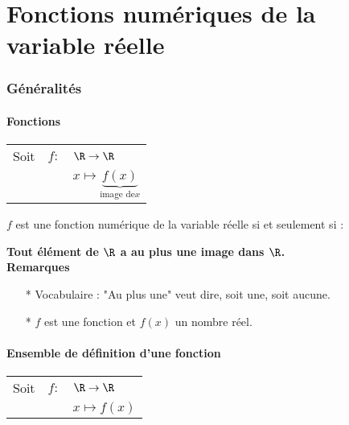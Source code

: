 \ifdefined\COMPLETE
\else
    
    
\fi


\vspace*{-.5cm}

\setcounter{section}{0} 

\part{Fonctions numériques de la variable réelle}

\section{Généralités}

\subsection{Fonctions}

\begin{tabular}{lll}
Soit & $f:$ & $ \R \rightarrow \R$ \\
& & $x\mapsto \underbrace{f(x)}_{\textrm{image de} x}$ \\
\end{tabular}

$f$ est une fonction numérique de la variable réelle si et seulement si :

\textbf{Tout élément de $\mathbf{\R}$ a au plus une image dans $\mathbf{\R}$.} \\

\textbf{Remarques}

\begin{itemize}


\item[*]Vocabulaire : "Au plus une" veut dire, soit une, soit aucune. \\ 

\item[*] $f$ est une fonction et $f(x)$ un nombre réel.
\end{itemize}
\subsection{Ensemble de définition d'une fonction}

\begin{tabular}{lll}

Soit & $f:$& $ \R \rightarrow \R$ \\
& & $x\mapsto f(x)$ \\
\end{tabular}

